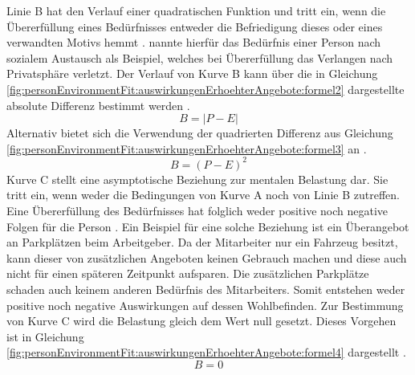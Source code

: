 Linie B hat den Verlauf einer quadratischen Funktion und tritt ein, wenn die Übererfüllung eines Bedürfnisses entweder die Befriedigung dieses oder eines verwandten Motivs hemmt \cite[S. 5]{caplan:1987}. \textcite[S. 12]{harrison:1978} nannte hierfür das Bedürfnis einer Person nach sozialem Austausch als Beispiel, welches bei Übererfüllung das Verlangen nach Privatsphäre verletzt. Der Verlauf von Kurve B kann über die in Gleichung \ref{fig:personEnvironmentFit:auswirkungenErhoehterAngebote:formel2} dargestellte absolute Differenz bestimmt werden \cite[S. 2]{edwards:1993}.
\begin{equation}
	B = |P - E|
	\label{fig:personEnvironmentFit:auswirkungenErhoehterAngebote:formel2}
\end{equation}
Alternativ bietet sich die Verwendung der quadrierten Differenz aus Gleichung \ref{fig:personEnvironmentFit:auswirkungenErhoehterAngebote:formel3} an \cite[S. 2]{edwards:1993}.
\begin{equation}
	B = (P - E)^2
	\label{fig:personEnvironmentFit:auswirkungenErhoehterAngebote:formel3}
\end{equation}
Kurve C stellt eine asymptotische Beziehung zur mentalen Belastung dar. Sie tritt ein, wenn weder die Bedingungen von Kurve A noch von Linie B zutreffen. Eine Übererfüllung des Bedürfnisses hat folglich weder positive noch negative Folgen für die Person \cite[S. 30]{mechanismsOfJobStressAndStrain:1982}. Ein Beispiel für eine solche Beziehung ist ein Überangebot an Parkplätzen beim Arbeitgeber. Da der Mitarbeiter nur ein Fahrzeug besitzt, kann dieser von zusätzlichen Angeboten keinen Gebrauch machen und diese auch nicht für einen späteren Zeitpunkt aufsparen. Die zusätzlichen Parkplätze schaden auch keinem anderen Bedürfnis des Mitarbeiters. Somit entstehen weder positive noch negative Auswirkungen auf dessen Wohlbefinden. Zur Bestimmung von Kurve C wird die Belastung gleich dem Wert null gesetzt. Dieses Vorgehen ist in Gleichung \ref{fig:personEnvironmentFit:auswirkungenErhoehterAngebote:formel4} dargestellt \cite[S. 2]{edwards:1993}.
\begin{equation}
	B = 0
	\label{fig:personEnvironmentFit:auswirkungenErhoehterAngebote:formel4}
\end{equation}
